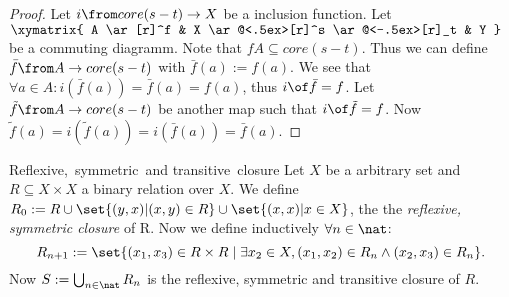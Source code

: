 \begin{answer}
  \begin{proof}
    Let $i \from core(s-t) \to X$ be a inclusion function. Let
    $\xymatrix{
      A \ar[r]^f & X \ar@<.5ex>[r]^s \ar@<-.5ex>[r]_t & Y
    }$
    be a commuting diagramm. Note that $f A \subseteq core(s-t)$.
    Thus we can define $\bar{f} \from A \to core(s-t)$ with $\bar{f}(a) := f(a)$.
    We see that $\forall a \in A: i(\bar{f}(a))=\bar{f}(a)=f(a)$, thus $i \of \bar{f} = f$.
    Let $\tilde{f} \from A \to core(s-t)$ be another map such that $i \of \tilde{f} = f$.
    Now $\tilde{f}(a) = i(\tilde{f}(a)) = i(\bar{f}(a)) = \bar{f}(a)$.
  \end{proof}
\end{answer}

\begin{definition}{Reflexive,\ symmetric\ and transitive\ closure}
  Let $X$ be a arbitrary set and $R \subseteq X \times X$ a binary relation over $X$.
  We define $R_0 := R \cup \set{ (y, x) | (x, y) \in R} \cup \set{ (x, x) | x \in X}$,
  the the \emph{reflexive, symmetric closure} of R.
  Now we define inductively $\forall n \in \nat$:
  \[R_{n+1} := \set{(x_1, x_3) \in R \times R \; | \; \exists x_2 \in X, (x_1, x_2) \in R_n \land (x_2, x_3) \in R_n}.\]
  Now $S := \bigcup_{n \in \nat}{R_n}$ is the reflexive, symmetric and transitive closure of $R$.
\end{definition}

